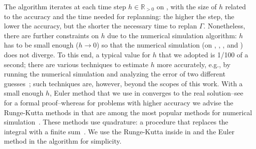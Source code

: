 The algorithm iterates at each time step $h\in\mathbb{R}_{>0}$ on , with the size of $h$ related to the accuracy and the time needed for replanning: the higher the step, the lower the accuracy, but the shorter the necessary time to replan $\Gamma$. Nonetheless, there are further constraints on $h$ due to the numerical simulation algorithm: $h$ has to be small enough ($h\rightarrow 0$) so that the numerical simulation (on , , , and ) does not diverge. To this end, a typical value for $h$ that we adopted is 1/100 of a second; there are various techniques to estimate $h$ more accurately, e.g., by running the numerical simulation and analyzing the error of two different guesses~\citep{iserles2009first}; such techniques are, however, beyond the scopes of this work. With a small enough $h$, Euler method that we use in  converges to the real solution--see~\citep{iserles2009first,atkinson2009euler} for a formal proof--whereas for problems with higher accuracy we advise the Runge-Kutta methods  in  that are among the most popular methods for numerical simulation~\citep{atkinson2009euler}. These methods use quadrature: a procedure that replaces the integral with a finite sum~\citep{iserles2009first}. We use the Runge-Kutta inside \powprof{} in  and the Euler method in the algorithm for simplicity.


